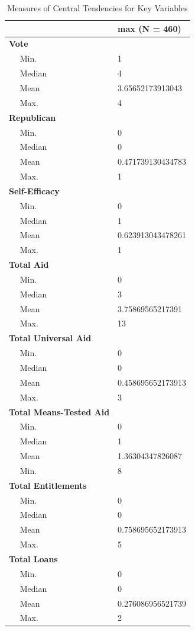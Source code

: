 \documentclass[12pt]{paper}
\begin{document}
\begin{table}
\begin{tabular}{l|l}
	\hline
	& max (N = 460)\\
	\hline
	\bf{Vote} & ~\\
	\hline
	~~ Min. & 1\\
	\hline
	~~ Median & 4\\
	\hline
	~~ Mean & 3.65652173913043\\
	\hline
	~~ Max. & 4\\
	\hline
	\bf{Republican} & ~\\
	\hline
	~~ Min. & 0\\
	\hline
	~~ Median & 0\\
	\hline
	~~ Mean & 0.471739130434783\\
	\hline
	~~ Max. & 1\\
	\hline
	\bf{Self-Efficacy} & ~\\
	\hline
	~~ Min. & 0\\
	\hline
	~~ Median & 1\\
	\hline
	~~ Mean & 0.623913043478261\\
	\hline
	~~ Max. & 1\\
	\hline
	\bf{Total Aid} & ~\\
	\hline
	~~ Min. & 0\\
	\hline
	~~ Median & 3\\
	\hline
	~~ Mean & 3.75869565217391\\
	\hline
	~~ Max. & 13\\
	\hline
	\bf{Total Universal Aid} & ~\\
	\hline
	~~ Min. & 0\\
	\hline
	~~ Median & 0\\
	\hline
	~~ Mean & 0.458695652173913\\
	\hline
	~~ Max. & 3\\
	\hline
	\bf{Total Means-Tested Aid} & ~\\
	\hline
	~~ Min. & 0\\
	\hline
	~~ Median & 1\\
	\hline
	~~ Mean & 1.36304347826087\\
	\hline
	~~ Min. & 8\\
	\hline
	\bf{Total Entitlements} & ~\\
	\hline
	~~ Min. & 0\\
	\hline
	~~ Median & 0\\
	\hline
	~~ Mean & 0.758695652173913\\
	\hline
	~~ Max. & 5\\
	\hline
	\bf{Total Loans} & ~\\
	\hline
	~~ Min. & 0\\
	\hline
	~~ Median & 0\\
	\hline
	~~ Mean & 0.276086956521739\\
	\hline
	~~ Max. & 2\\
	\hline
\end{tabular}
\caption{Measures of Central Tendencies for Key Variables}
\label{Appendix C.1}
\end{table}
\end{document}

